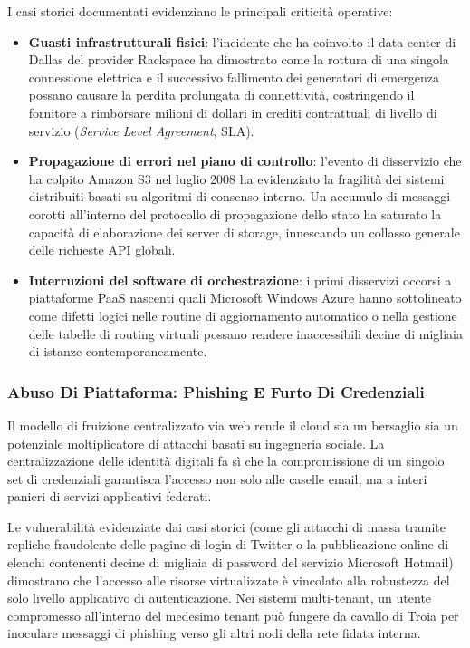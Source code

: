 \documentclass[11pt, a4paper]{article}
\begin{document}
I casi storici documentati evidenziano le principali criticità operative:
\begin{itemize}
    \item \textbf{Guasti infrastrutturali fisici}: l'incidente che ha coinvolto il data center di Dallas del provider Rackspace ha dimostrato come la rottura di una singola connessione elettrica e il successivo fallimento dei generatori di emergenza possano causare la perdita prolungata di connettività, costringendo il fornitore a rimborsare milioni di dollari in crediti contrattuali di livello di servizio (\emph{Service Level Agreement}, SLA).
    \item \textbf{Propagazione di errori nel piano di controllo}: l'evento di disservizio che ha colpito Amazon S3 nel luglio 2008 ha evidenziato la fragilità dei sistemi distribuiti basati su algoritmi di consenso interno. Un accumulo di messaggi corotti all'interno del protocollo di propagazione dello stato ha saturato la capacità di elaborazione dei server di storage, innescando un collasso generale delle richieste API globali.
    \item \textbf{Interruzioni del software di orchestrazione}: i primi disservizi occorsi a piattaforme PaaS nascenti quali Microsoft Windows Azure hanno sottolineato come difetti logici nelle routine di aggiornamento automatico o nella gestione delle tabelle di routing virtuali possano rendere inaccessibili decine di migliaia di istanze contemporaneamente.
\end{itemize}

\subsubsection{Abuso Di Piattaforma: Phishing E Furto Di Credenziali}
Il modello di fruizione centralizzato via web rende il cloud sia un bersaglio sia un potenziale moltiplicatore di attacchi basati su ingegneria sociale. La centralizzazione delle identità digitali fa sì che la compromissione di un singolo set di credenziali garantisca l'accesso non solo alle caselle email, ma a interi panieri di servizi applicativi federati.


Le vulnerabilità evidenziate dai casi storici (come gli attacchi di massa tramite repliche fraudolente delle pagine di login di Twitter o la pubblicazione online di elenchi contenenti decine di migliaia di password del servizio Microsoft Hotmail) dimostrano che l'accesso alle risorse virtualizzate è vincolato alla robustezza del solo livello applicativo di autenticazione. Nei sistemi multi-tenant, un utente compromesso all'interno del medesimo tenant può fungere da cavallo di Troia per inoculare messaggi di phishing verso gli altri nodi della rete fidata interna.
\end{document}
